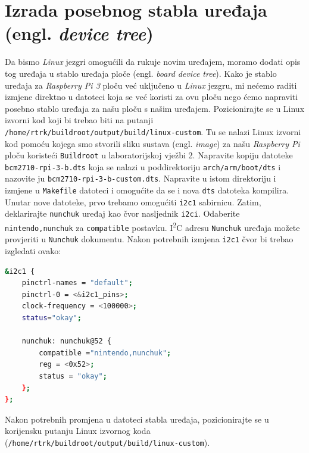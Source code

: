 \documentclass[11pt]{article}
\begin{document}
\section{Izrada posebnog stabla uređaja (engl. \textit{device tree})}
Da bismo \textit{Linux} jezgri omogućili da rukuje novim uređajem, moramo dodati
opis tog uređaja u stablo uređaja ploče (engl. \textit{board device tree}).
Kako je stablo uređaja za \textit{Raspberry Pi 3} ploču već uključeno u
\textit{Linux} jezgru, mi nećemo raditi izmjene direktno u datoteci koja se već
koristi za ovu ploču nego ćemo napraviti posebno stablo uređaja za našu ploču
s našim uređajem.
\newline
\newline
Pozicionirajte se u Linux izvorni kod koji bi trebao biti na putanji\\
\texttt{/home/rtrk/buildroot/output/build/linux-custom}. Tu se nalazi Linux
izvorni kod pomoću kojega smo stvorili sliku sustava (engl. \textit{image})
za našu \textit{Raspberry Pi} ploču koristeći \texttt{Buildroot} u laboratorijskoj
vježbi 2. Napravite kopiju datoteke \texttt{bcm2710-rpi-3-b.dts} koja se nalazi
u poddirektoriju \texttt{arch/arm/boot/dts} i nazovite ju \texttt{bcm2710-rpi-3-b-custom.dts}.
Napravite u istom direktoriju i izmjene u \texttt{Makefile} datoteci i
omogućite da se i nova \texttt{dts} datoteka kompilira.
\newline
\newline
Unutar nove datoteke, prvo trebamo omogućiti \texttt{i2c1} sabirnicu.
Zatim, deklarirajte \texttt{nunchuk} uređaj kao čvor nasljednik \texttt{i2ci}.
Odaberite \texttt{nintendo,nunchuk} za \texttt{compatible} postavku.
I\textsuperscript{2}C adresu \texttt{Nunchuk} uređaja možete provjeriti u
\texttt{Nunchuk} dokumentu.
\newline
\newline
Nakon potrebnih izmjena \texttt{i2c1} čvor bi trebao izgledati ovako:
\begin{lstlisting}[language=bash]
&i2c1 {
	pinctrl-names = "default";
	pinctrl-0 = <&i2c1_pins>;
	clock-frequency = <100000>;
	status="okay";

	nunchuk: nunchuk@52 {
		compatible ="nintendo,nunchuk";
		reg = <0x52>;
		status = "okay";
	};
};
\end{lstlisting}
Nakon potrebnih promjena u datoteci stabla uređaja, pozicionirajte se u
korijensku putanju Linux izvornog koda\\
(\texttt{/home/rtrk/buildroot/output/build/linux-custom}).\\
\end{document}
